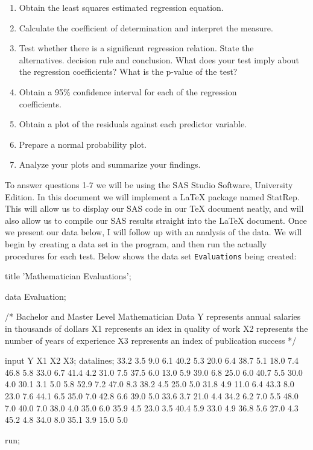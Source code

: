 \documentclass[oneside,10pt]{article}
\begin{document}
\begin{mdframed}
{			\begin{enumerate}
				\item Obtain the least squares estimated regression equation.
				\item Calculate the coefficient of determination and interpret the measure. 
				\item Test whether there is a significant regression relation. State the\\ alternatives. decision rule and conclusion. What does your test imply about the regression coefficients? What is the p-value of the test?
				\item Obtain a 95\% confidence interval for each of the regression\\ coefficients.
				\item Obtain a plot of the residuals against each predictor variable.
				\item Prepare a normal probability plot.
				\item Analyze your plots and summarize your findings.
			\end{enumerate}
		}
	\end{mdframed} \newpage
	To answer questions 1-7 we will be using the SAS Studio Software, University Edition. In this document we will implement a \LaTeX \hspace{0.5mm} package named StatRep. This will allow us to display our SAS code in our \TeX \hspace{0.5mm} document neatly, and will also allow us to compile our SAS results straight into the \LaTeX \hspace{0.5mm} document. Once we present our data below, I will follow up with an analysis of the data. We will begin by creating a data set in the program, and then run the actually procedures for each test. Below shows the data set \texttt{Evaluations} being created:
	\begin{Datastep}[first=15, last=5] 
		title 'Mathematician Evaluations';

		data Evaluation;
		
			/* 	Bachelor and Master Level Mathematician Data
				Y represents annual salaries in thousands of dollars
				X1 represents an idex in quality of work
				X2 represents the number of years of experience
				X3 represents an index of publication success */
				
		input Y X1 X2 X3;
		datalines;
		33.2 3.5  9.0 6.1
		40.2 5.3 20.0 6.4
		38.7 5.1 18.0 7.4
		46.8 5.8 33.0 6.7
		41.4 4.2 31.0 7.5
		37.5 6.0 13.0 5.9
		39.0 6.8 25.0 6.0
		40.7 5.5 30.0 4.0
		30.1 3.1  5.0 5.8
		52.9 7.2 47.0 8.3
		38.2 4.5 25.0 5.0
		31.8 4.9 11.0 6.4
		43.3 8.0 23.0 7.6
		44.1 6.5 35.0 7.0
		42.8 6.6 39.0 5.0
		33.6 3.7 21.0 4.4
		34.2 6.2  7.0 5.5
		48.0 7.0 40.0 7.0
		38.0 4.0 35.0 6.0
		35.9 4.5 23.0 3.5
		40.4 5.9 33.0 4.9
		36.8 5.6 27.0 4.3
		45.2 4.8 34.0 8.0
		35.1 3.9 15.0 5.0
		
		run;
	\end{Datastep}
\end{document}
